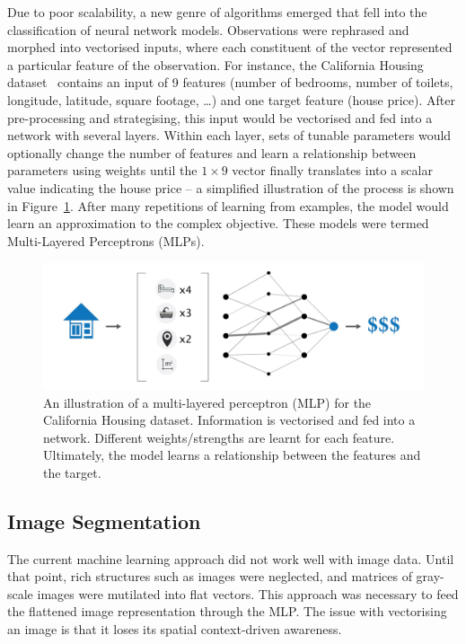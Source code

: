 \documentclass[11pt,twoside]{report}
\begin{document}
Due to poor scalability, a new genre of algorithms emerged that fell into the classification of neural network models. Observations were rephrased and morphed into vectorised inputs, where each constituent of the vector represented a particular feature of the observation. For instance, the California Housing dataset~\cite{kelleypace1997} contains an input of 9 features (number of bedrooms, number of toilets, longitude, latitude, square footage, \dots) and one target feature (house price). After pre-processing and strategising, this input would be vectorised and fed into a network with several layers. Within each layer, sets of tunable parameters would optionally change the number of features and learn a relationship between parameters using weights until the $1 \times 9$ vector finally translates into a scalar value indicating the house price -- a simplified illustration of the process is shown in Figure~\ref{fig:california-housing}. After many repetitions of learning from examples, the model would learn an approximation to the complex objective. These models were termed Multi-Layered Perceptrons (MLPs).

\begin{figure}[H]
  \centering
  \includegraphics[width=.7\linewidth]{../figures/california.jpeg}
  \caption{An illustration of a multi-layered perceptron (MLP) for the California Housing dataset. Information is vectorised and fed into a network. Different weights/strengths are learnt for each feature. Ultimately, the model learns a relationship between the features and the target.}\label{fig:california-housing}
\end{figure}

\subsection{Image Segmentation}\label{sect:image-segmentation}

The current machine learning approach did not work well with image data. Until that point, rich structures such as images were neglected, and matrices of gray-scale images were mutilated into flat vectors. This approach was necessary to feed the flattened image representation through the MLP. The issue with vectorising an image is that it loses its spatial context-driven awareness. 
\end{document}
